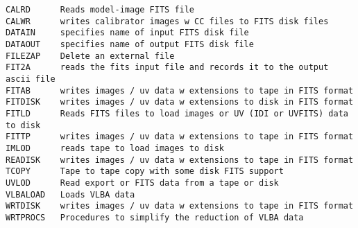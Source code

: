\vskip 0.5pt
\bbve\begin{verbatim}
CALRD      Reads model-image FITS file
CALWR      writes calibrator images w CC files to FITS disk files
DATAIN     specifies name of input FITS disk file
DATAOUT    specifies name of output FITS disk file
FILEZAP    Delete an external file
FIT2A      reads the fits input file and records it to the output ascii file
FITAB      writes images / uv data w extensions to tape in FITS format
FITDISK    writes images / uv data w extensions to disk in FITS format
FITLD      Reads FITS files to load images or UV (IDI or UVFITS) data to disk
FITTP      writes images / uv data w extensions to tape in FITS format
IMLOD      reads tape to load images to disk
READISK    writes images / uv data w extensions to tape in FITS format
TCOPY      Tape to tape copy with some disk FITS support
UVLOD      Read export or FITS data from a tape or disk
VLBALOAD   Loads VLBA data
WRTDISK    writes images / uv data w extensions to tape in FITS format
WRTPROCS   Procedures to simplify the reduction of VLBA data
\end{verbatim}\eve


